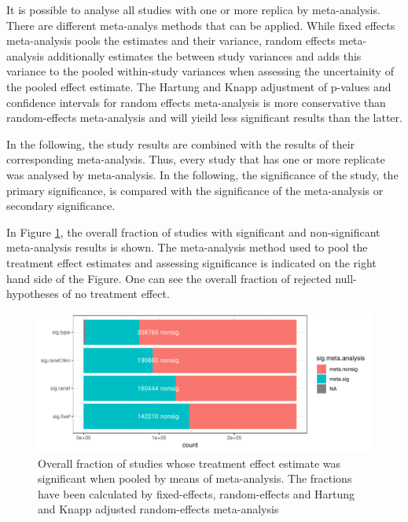 \documentclass[11pt,a4paper,twoside]{book}\usepackage[]{graphicx}\usepackage[]{color}
\newenvironment{knitrout}{}{} %
\begin{document}
It is possible to analyse all studies with one or more replica by meta-analysis. There are different meta-analys methods that can be applied. While fixed effects meta-analysis pools the estimates and their variance, random effects meta-analysis additionally estimates the between study variances and adds this variance to the pooled within-study variances when assessing the uncertainity of the pooled effect estimate. The Hartung and Knapp adjustment of p-values and confidence intervals for random effects meta-analysis is more conservative than random-effects meta-analysis and will yieild less significant results than the latter.

\vspace{0mm}
In the following, the study results are combined with the results of their corresponding meta-analysis. Thus, every study that has one or more replicate was analysed by meta-analysis. In the following, the significance of the study, the primary significance, is compared with the significance of the meta-analysis or secondary significance.

\vspace{0mm}
In Figure \ref{primary.secondary.significance}, the overall fraction of studies with significant and non-significant meta-analysis results is shown. The meta-analysis method used to pool the treatment effect estimates and assessing significance is indicated on the right hand side of the Figure. One can see the overall fraction of rejected null-hypotheses of no treatment effect.

\begin{figure}
\begin{knitrout}
\color{fgcolor}

{\centering \includegraphics[width=\textwidth-3cm]{figure/ch02_figunnamed-chunk-14-1} 

}



\end{knitrout}
\caption{Overall fraction of studies whose treatment effect estimate was significant when pooled by means of meta-analysis. The fractions have been calculated
by fixed-effects, random-effects and Hartung and Knapp adjusted random-effects meta-analysis}
\label{primary.secondary.significance}
\end{figure}
\end{document}
